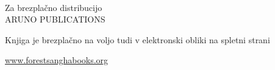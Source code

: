 
{\pagestyle{empty}

{\raggedleft\setlength{\parskip}{1em}\setlength{\parindent}{0em}

\vspace*{5\baselineskip}
{\fontsize{22}{25}\shakerLightFont\color{textbody} \MakeUppercase{\thetitle}%
\par\vspace*{\baselineskip}\vspace*{-0.1\baselineskip} {\fontsize{12}{15}\shakerLightFont \thesubtitle\\
\theauthor

}}

\vfill

{\shakerLightFont%
Za brezplačno distribucijo\\
ARUNO PUBLICATIONS

Knjiga je brezplačno na voljo tudi v elektronski obliki na spletni strani

\vspace*{-0.8\baselineskip}%
{\fontsize{10}{12}\shakerLightFont\href{http://www.forestsanghabooks.org/}{www.forestsanghabooks.org}}%

}}}

